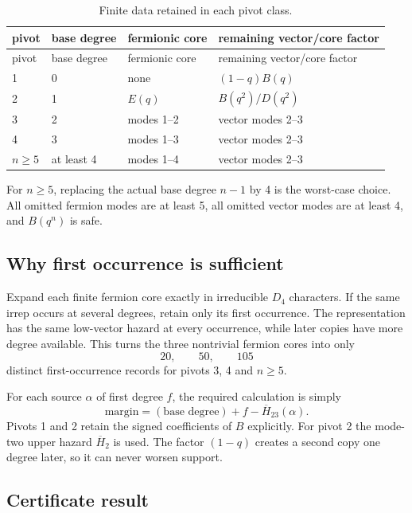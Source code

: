 \documentclass[11pt,a4paper]{article}
\theoremstyle{definition}
\begin{document}
\begin{longtable}{p{}p{}p{}p{}}
\caption{Finite data retained in each pivot class.}
\label{tab:pivots}\\
\toprule
pivot & base degree & fermionic core & remaining vector/core factor \\
\midrule
\endfirsthead
\toprule
pivot & base degree & fermionic core & remaining vector/core factor \\
\midrule
\endhead
1 & 0 & none & $(1-q)B(q)$ \\
2 & 1 & $E(q)$ & $B(q^2)/D(q^2)$ \\
3 & 2 & modes 1--2 & vector modes 2--3 \\
4 & 3 & modes 1--3 & vector modes 2--3 \\
$n\geq5$ & at least 4 & modes 1--4 & vector modes 2--3 \\
\bottomrule
\end{longtable}

For $n\geq5$, replacing the actual base degree $n-1$ by 4 is the worst-case
choice.  All omitted fermion modes are at least 5, all omitted vector modes
are at least 4, and $B(q^n)$ is safe.

\subsection{Why first occurrence is sufficient}

Expand each finite fermion core exactly in irreducible $D_4$ characters.  If
the same irrep occurs at several degrees, retain only its first occurrence.
The representation has the same low-vector hazard at every occurrence, while
later copies have more degree available.  This turns the three nontrivial
fermion cores into only
\[
   20,\qquad 50,\qquad 105
\]
distinct first-occurrence records for pivots 3, 4 and $n\geq5$.

For each source $\alpha$ of first degree $f$, the required calculation is
simply
\[
   \text{margin}=(\text{base degree})+f-\overline H_{23}(\alpha).
\]
Pivots 1 and 2 retain the signed coefficients of $B$ explicitly.  For pivot
2 the mode-two upper hazard $\overline H_2$ is used.  The factor $(1-q)$
creates a second copy one degree later, so it can never worsen support.

\subsection{Certificate result}
\end{document}

